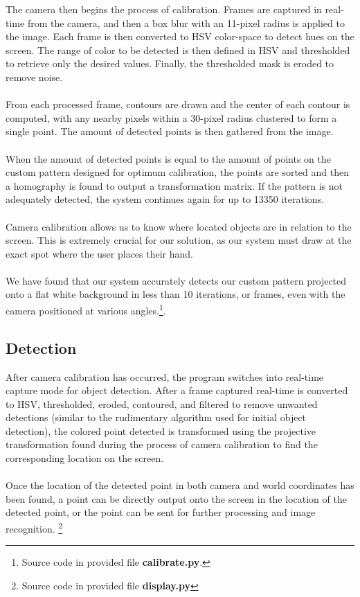 \documentclass[twoside,twocolumn]{article}
\begin{document}
The camera then begins the process of calibration. Frames are captured in real-time from the camera, and then a box blur with an 11-pixel radius is applied to the image. Each frame is then converted to HSV color-space to detect hues on the screen. The range of color to be detected is then defined in HSV and thresholded to retrieve only the desired values. Finally, the thresholded mask is eroded to remove noise.\\ \\
From each processed frame, contours are drawn and the center of each contour is computed, with any nearby pixels within a 30-pixel radius clustered to form a single point. The amount of detected points is then gathered from the image. \\ \\
When the amount of detected points is equal to the amount of points on the custom pattern designed for optimum calibration, the points are sorted and then a homography is found to output a transformation matrix. If the pattern is not adequately detected, the system continues again for up to 13350 iterations.\\ \\
Camera calibration allows us to know where located objects are in relation to the screen. This is extremely crucial for our solution, as our system must draw at the exact spot where the user places their hand.\\ \\
We have found that our system accurately detects our custom pattern projected onto a flat white background in less than 10 iterations, or frames, even with the camera positioned at various angles.\footnote{Source code in provided file \textbf{calibrate.py}.}.

\subsection{Detection}
After camera calibration has occurred, the program switches into real-time capture mode for object detection. After a frame captured real-time is converted to HSV, thresholded, eroded, contoured, and filtered to remove unwanted detections (similar to the rudimentary algorithm used for initial object detection), the colored point detected is transformed using the projective transformation found during the process of camera calibration to find the corresponding location on the screen.\\ \\ Once the location of the detected point in both camera and world coordinates has been found, a point can be directly output onto the screen in the location of the detected point, or the point can be sent for further processing and image recognition. \footnote{Source code in provided file \textbf{display.py}}
\end{document}
